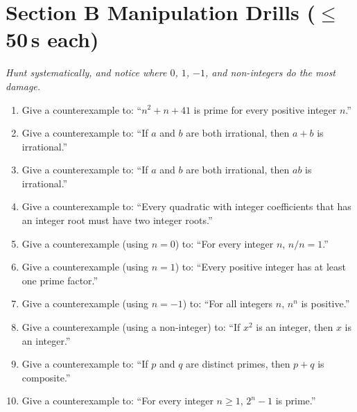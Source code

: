 \documentclass[11pt,a4paper]{article}
\begin{document}
\section*{Section B \quad Manipulation Drills \hfill{\normalfont\small($\leq$50\,s each)}}

\noindent\textit{Hunt systematically, and notice where $0$, $1$, $-1$, and non-integers do the most damage.}

\begin{enumerate}

\item Give a counterexample to: ``$n^2+n+41$ is prime for every positive integer $n$.''

\item Give a counterexample to: ``If $a$ and $b$ are both irrational, then $a+b$ is irrational.''

\item Give a counterexample to: ``If $a$ and $b$ are both irrational, then $ab$ is irrational.''

\item Give a counterexample to: ``Every quadratic with integer coefficients that has an integer root must have two integer roots.''

\item Give a counterexample (using $n=0$) to: ``For every integer $n$, $n/n = 1$.''

\item Give a counterexample (using $n=1$) to: ``Every positive integer has at least one prime factor.''

\item Give a counterexample (using $n=-1$) to: ``For all integers $n$, $n^n$ is positive.''

\item Give a counterexample (using a non-integer) to: ``If $x^2$ is an integer, then $x$ is an integer.''

\item Give a counterexample to: ``If $p$ and $q$ are distinct primes, then $p+q$ is composite.''

\item Give a counterexample to: ``For every integer $n \geq 1$, $2^n - 1$ is prime.''

\end{enumerate}

\end{document}
